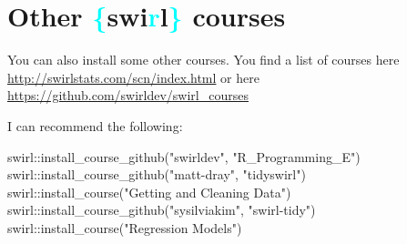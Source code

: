 \section{Other \textcolor{cyan}{\{}swi\textcolor{cyan}{r}l\textcolor{cyan}{\}} courses}
You can also install some other courses. You find a list of courses here \websmall\url{http://swirlstats.com/scn/index.html} or here \websmall\url{https://github.com/swirldev/swirl_courses}

I can recommend the following:
\begin{rblock1}
	swirl::install_course_github("swirldev", "R_Programming_E")
	swirl::install_course_github("matt-dray", "tidyswirl")
	swirl::install_course("Getting and Cleaning Data")
	swirl::install_course_github("sysilviakim", "swirl-tidy")
	swirl::install_course("Regression Models")
\end{rblock1}



